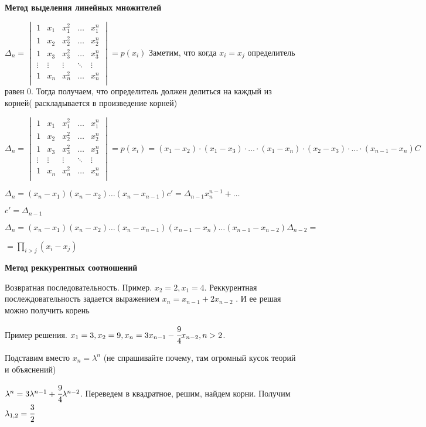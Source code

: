  \textbf{Метод выделения линейных множителей}

 
 \(
 \Delta_n = \begin{vmatrix}
    1 & x_1 & x_1^2 & \ldots & x_1^n \\
     1 & x_2 & x_2^2 & \ldots & x_2^n \\
      1 & x_3 & x_3^2 & \ldots & x_3^n \\
     \vdots & \vdots & \vdots & \ddots & \vdots \\
     1 & x_n & x_n^2 & \ldots & x_n^n \\
 \end{vmatrix} = p(x_i)
 \)
 Заметим, что когда \(x_i  = x_j \) определитель равен 0. Тогда получаем, что определитель должен делиться на каждый из корней( раскладывается в произведение корней)

  \(
 \Delta_n = \begin{vmatrix}
    1 & x_1 & x_1^2 & \ldots & x_1^n \\
     1 & x_2 & x_2^2 & \ldots & x_2^n \\
      1 & x_3 & x_3^2 & \ldots & x_3^n \\
     \vdots & \vdots & \vdots & \ddots & \vdots \\
     1 & x_n & x_n^2 & \ldots & x_n^n \\
 \end{vmatrix} = p(x_i) = (x_1 - x_2) \cdot (x_1  - x_3) \cdot \ldots \cdot (x_1 - x_n) \cdot (x_2 - x_3) \cdot \ldots \cdot (x_{n-1}-x_n) C 
 \)

\(\Delta_n = (x_n - x_1)(x_n - x_2)\ldots(x_n - x_{n - 1}) c' = \Delta_{n - 1} x_n^{n - 1} + \ldots\)

\(c' = \Delta_{n - 1}\)

\(\Delta_n = (x_n - x_1)(x_n - x_2)\ldots(x_n - x_{n - 1})(x_{n - 1} - x_n)\ldots(x_{n - 1} - x_{n - 2}) \Delta_{n - 2} =\)

\(= \prod\limits_{i > j}(x_i - x_j)\)

\textbf{Метод реккурентных соотношений}

 Возвратная последовательность. Пример.  \( x_2 =2 , x_1 = 4\). Реккурентная послеждовательность задается выражением \( x_n = x_{n-1} +2 x_{n-2}\) . И ее решая можно получить  корень 

Пример решения. \(x_1 =3, x_2 = 9, x_n = 3x_{n-1}-\cfrac{9}{4}x_{n-2}, n >2\).

Подставим вместо \(x_n = \lambda^n \) (не спрашивайте почему, там огромный кусок теорий и объяснений)

\( \lambda^n  = 3\lambda^{n-1} +  \cfrac{9}{4}\lambda^{n-2}\). Переведем в квадратное, решим, найдем корни. Получим \(\lambda_{1,2} = \cfrac{3}{2}\)

